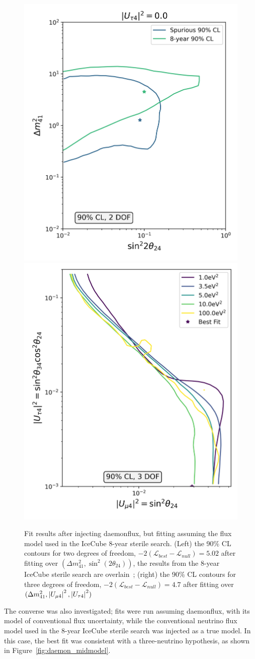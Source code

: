 \documentclass[main.tex]{subfiles}
\begin{document}
\begin{figure}  
    \centering
    \includegraphics[width=0.45\linewidth]{figures/track_daemon_mismodel_Realization_daemon_Asimov_sterile_0_cl0.9_dof2.png}
    \includegraphics[width=0.45\linewidth]{figures/track_daemon_mismodel_nomeow_Realization_daemon_Asimov_sterile_0_cl0.9_dof3.png}
    \caption{Fit results after injecting daemonflux, but fitting assuming the flux model used in the IceCube 8-year sterile search. (Left) the 90\% CL contours for two degrees of freedom, $-2(\mathcal{L}_{best}-\mathcal{L}_{null})=5.02$ after fitting over $(\Delta m_{41}^{2}, \sin^{2}(2\theta_{24}))$, the results from the 8-year IceCube sterile search are overlain~\cite{Aartsen_2020, Aartsen_2020_prd}; (right) the 90\% CL contours for three degrees of freedom, $-2(\mathcal{L}_{best}-\mathcal{L}_{null})=4.7$ after fitting over $(\Delta m_{41}^{2}, \left| U_{\mu4} \right|^{2}, \left| U_{\tau 4} \right|^{2})$}\label{fig:uhoh_mismodel_worse}
\end{figure}

The converse was also investigated; fits were run assuming daemonflux, with its model of conventional flux uncertainty, while the conventional neutrino flux model used in the 8-year IceCube sterile search was injected as a true model. 
In this case, the best fit was consistent with a three-neutrino hypothesis, as shown in Figure~\ref{fig:daemon_midmodel}.
\end{document}
